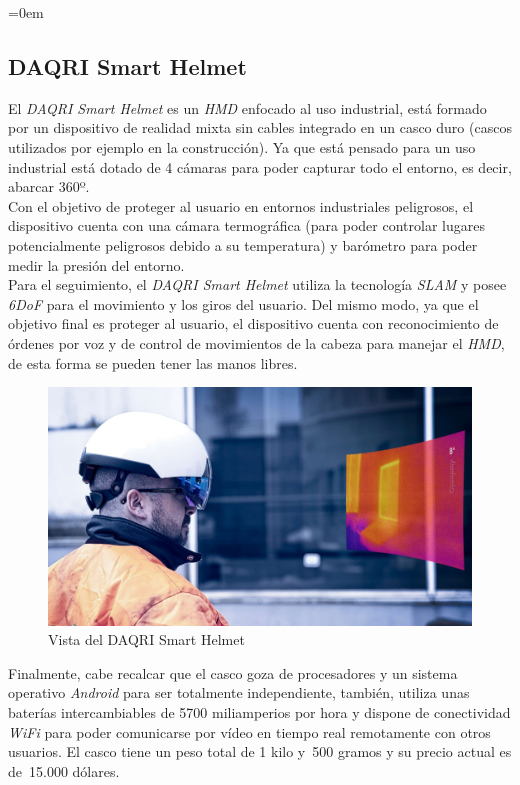 \parindent=0em
\subsection{DAQRI Smart Helmet}
\noindent


El \textit{DAQRI Smart Helmet} es un \textit{HMD} enfocado al uso industrial, está formado por un dispositivo de realidad mixta sin cables integrado en un casco duro (cascos utilizados por ejemplo en la construcción). Ya que está pensado para un uso industrial está dotado de 4 cámaras para poder capturar todo el entorno, es decir, abarcar 360º.\\

Con el objetivo de proteger al usuario en entornos industriales peligrosos, el dispositivo cuenta con una cámara termográfica (para poder controlar lugares potencialmente peligrosos debido a su temperatura) y barómetro para poder medir la presión del entorno.\\

Para el seguimiento, el \textit{DAQRI Smart Helmet} utiliza la tecnología \textit{SLAM} y posee \textit{6DoF} para el movimiento y los giros del usuario. Del mismo modo, ya que el objetivo final es proteger al usuario, el dispositivo cuenta con reconocimiento de órdenes por voz y de control de movimientos de la cabeza para manejar el \textit{HMD}, de esta forma se pueden tener las manos libres.\\

\begin{figure}[h]
    \centering
    \includegraphics[scale=0.12]{Images/Estado del arte/daqrihelmet.jpg}
    \caption{Vista del DAQRI Smart Helmet}
    \label{fig:vistaDAQRIHelmet}
\end{figure}

Finalmente, cabe recalcar que el casco goza de procesadores y un sistema operativo \textit{Android} para ser totalmente independiente, también, utiliza unas baterías intercambiables de 5700 miliamperios por hora y dispone de conectividad \textit{WiFi} para poder comunicarse por vídeo en tiempo real remotamente con otros usuarios. El casco tiene un peso total de 1 kilo y~500 gramos y su precio actual es de~15.000 dólares.




